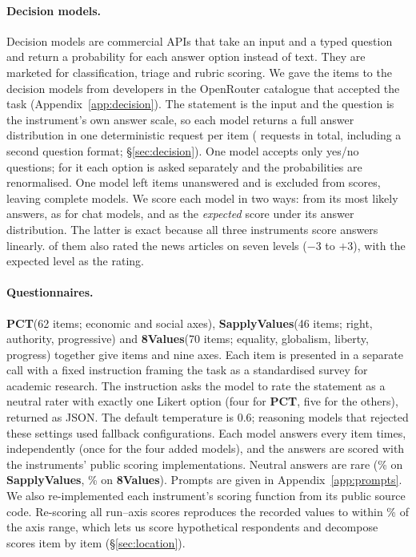 \documentclass[11pt]{article}
\newcommand{\instPCT}[1]{\textcolor{cPCT}{\textbf{#1}}}
\newcommand{\instSAP}[1]{\textcolor{cSAP}{\textbf{#1}}}
\newcommand{\instEV}[1]{\textcolor{cEV}{\textbf{#1}}}
\newcommand{\pct}{\instPCT{PCT}\xspace}
\newcommand{\sap}{\instSAP{SapplyValues}\xspace}
\newcommand{\ev}{\instEV{8Values}\xspace}
\begin{document}
\paragraph{Decision models.}
Decision models are commercial APIs that take an input and a typed question and return a probability for each answer option instead of text. They are marketed for classification, triage and rubric scoring. We gave the \nNItems{} items to the \nDNModels{} decision models from \nDNDev{} developers in the OpenRouter catalogue that accepted the task (Appendix~\ref{app:decision}). The statement is the input and the question is the instrument's own answer scale, so each model returns a full answer distribution in one deterministic request per item (\nDNRequests{} requests in total, including a second question format; \S\ref{sec:decision}). One model accepts only yes/no questions; for it each option is asked separately and the probabilities are renormalised. One model left \nLunaRefNative{} items unanswered and is excluded from scores, leaving \nDNComplete{} complete models. We score each model in two ways: from its most likely answers, as for chat models, and as the \emph{expected} score under its answer distribution. The latter is exact because all three instruments score answers linearly. \nDNNews{} of them also rated the news articles on seven levels ($-3$ to $+3$), with the expected level as the rating.

\paragraph{Questionnaires.}
\pct (62 items; economic and social axes), \sap (46 items; right, authority, progressive) and \ev (70 items; equality, globalism, liberty, progress) together give \nNItems{} items and nine axes. Each item is presented in a separate call with a fixed instruction framing the task as a standardised survey for academic research. The instruction asks the model to rate the statement as a neutral rater with exactly one Likert option (four for \pct, five for the others), returned as JSON. The default temperature is 0.6; reasoning models that rejected these settings used fallback configurations. Each model answers every item \nNRuns{} times, independently (once for the four added models), and the answers are scored with the instruments' public scoring implementations. Neutral answers are rare (\nNeutralSap\% on \sap, \nNeutralEight\% on \ev). Prompts are given in Appendix~\ref{app:prompts}. We also re-implemented each instrument's scoring function from its public source code. Re-scoring all \nRescoreN{} run--axis scores reproduces the recorded values to within \nRescoreMaxDiff\% of the axis range, which lets us score hypothetical respondents and decompose scores item by item (\S\ref{sec:location}).
\end{document}
